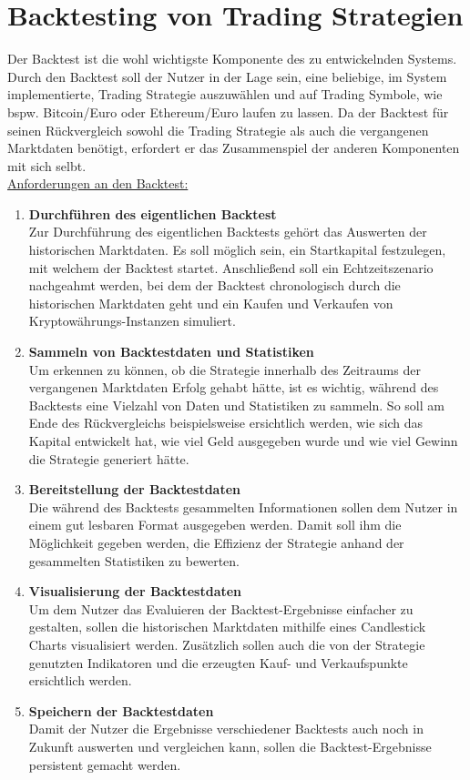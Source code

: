 \documentclass[oneside]{ausarbeitung}
\begin{document}
\section{Backtesting von Trading Strategien}
\label{sec:backtesting}

Der Backtest ist die wohl wichtigste Komponente des zu entwickelnden
Systems. Durch den Backtest soll der Nutzer in der Lage sein, eine
beliebige, im System implementierte, Trading Strategie auszuwählen
und auf Trading Symbole, wie bspw. Bitcoin/Euro oder Ethereum/Euro laufen zu
lassen. Da der Backtest für seinen Rückvergleich sowohl die Trading
Strategie als auch die vergangenen Marktdaten benötigt, erfordert er
das Zusammenspiel der anderen Komponenten mit sich selbt. \\

\underline{Anforderungen an den Backtest:}
\begin{enumerate}
	\item \textbf{Durchführen des eigentlichen Backtest} \\
		Zur Durchführung des eigentlichen Backtests gehört das Auswerten der 
		historischen Marktdaten. Es soll möglich sein, ein Startkapital
		festzulegen, mit welchem der Backtest startet. Anschließend soll ein
		Echtzeitszenario nachgeahmt werden, bei dem der Backtest chronologisch
		durch die historischen Marktdaten geht und ein Kaufen und Verkaufen von
		Kryptowährungs-Instanzen simuliert.  
	\item \textbf{Sammeln von Backtestdaten und Statistiken} \\
		Um erkennen zu können, ob die Strategie innerhalb des Zeitraums der 
		vergangenen Marktdaten Erfolg gehabt hätte, ist es wichtig, während des 
		Backtests eine Vielzahl	von Daten und Statistiken zu sammeln. So soll am
		Ende des Rückvergleichs beispielsweise ersichtlich werden, wie sich das
		Kapital entwickelt hat, wie viel Geld ausgegeben wurde und wie viel
		Gewinn die Strategie generiert hätte.
	\item \textbf{Bereitstellung der Backtestdaten} \\
		Die während des Backtests gesammelten Informationen sollen dem Nutzer
		in einem gut lesbaren Format ausgegeben werden. Damit soll ihm
		die Möglichkeit gegeben werden, die Effizienz der Strategie anhand der
		gesammelten Statistiken zu bewerten.
	\item \textbf{Visualisierung der Backtestdaten} \\
		Um dem Nutzer das Evaluieren der Backtest-Ergebnisse einfacher zu
		gestalten, sollen die historischen Marktdaten mithilfe eines
		Candlestick Charts visualisiert werden. Zusätzlich sollen auch die
		von der Strategie genutzten Indikatoren und die erzeugten Kauf- und
		Verkaufspunkte ersichtlich werden.
	\item \textbf{Speichern der Backtestdaten} \\
		Damit der Nutzer die Ergebnisse verschiedener Backtests auch noch in
		Zukunft auswerten und vergleichen kann, sollen die Backtest-Ergebnisse
		persistent gemacht werden.
\end{enumerate}
\end{document}
